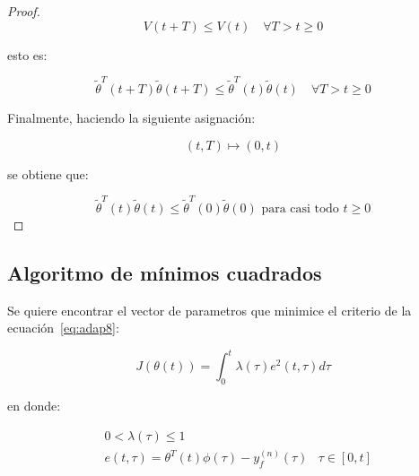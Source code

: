 \begin{proof}
                \begin{equation*}
                    V(t + T) \le V(t) \quad \forall T > t \ge 0
                \end{equation*}

                esto es:

                \begin{equation*}
                    \tilde{\theta}^T(t + T) \tilde{\theta}(t + T) \le \tilde{\theta}^T(t) \tilde{\theta}(t) \quad \forall T > t \ge 0
                \end{equation*}

                Finalmente, haciendo la siguiente asignación:

                \begin{equation*}
                    (t, T) \mapsto (0, t)
                \end{equation*}

                se obtiene que:

                \begin{equation*}
                    \tilde{\theta}^T(t) \tilde{\theta}(t) \le \tilde{\theta}^T(0) \tilde{\theta}(0) \text{ para casi todo } t \ge 0
                \end{equation*}
            \end{proof}


        \subsection{Algoritmo de mínimos cuadrados}

            \begin{problema}
                Se quiere encontrar el vector de parametros que minimice el criterio de la ecuación~\ref{eq:adap8}:

                \begin{equation} \label{eq:adap8}
                    J \left( \theta(t) \right) = \int_0^t \lambda(\tau) e^2 (t, \tau) d\tau
                \end{equation}

                en donde:

                \begin{eqnarray}
                    & 0 < \lambda(\tau) \le 1 & \nonumber \\
                    & e(t, \tau) = \theta^T(t) \phi(\tau) - y_f^{(n)}(\tau) & \tau \in [0, t]
                \end{eqnarray}
            \end{problema}

